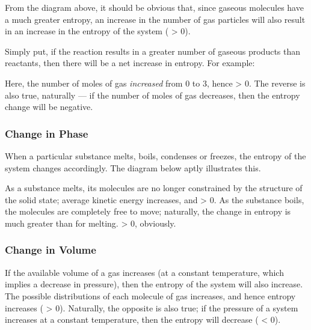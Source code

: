 				From the diagram above, it should be obvious that, since gaseous molecules have a much greater entropy, an increase in the number
				of gas particles will also result in an increase in the entropy of the system (\entr{} > 0).

				Simply put, if the reaction results in a greater number of gaseous products than reactants, then there will be a net
				increase in entropy. For example:


				Here, the number of moles of gas \emph{increased} from 0 to 3, hence \entr{} > 0. The reverse is also true, naturally --- if the
				number of moles of gas decreases, then the entropy change will be negative.


			\pagebreak
			\subsubsection{Change in Phase}

				When a particular substance melts, boils, condenses or freezes, the entropy of the system changes accordingly.
				The diagram below aptly illustrates this.


				As a substance melts, its molecules are no longer constrained by the structure of the solid state; average kinetic energy increases,
				and \entr{} > 0. As the substance boils, the molecules are completely free to move; naturally, the change in entropy is much greater
				than for melting. \entr{} > 0, obviously.


			\subsubsection{Change in Volume}

				If the available volume of a gas increases (at a constant temperature, which implies a decrease in pressure), then the entropy
				of the system will also increase. The possible distributions of each molecule of gas increases, and hence entropy increases
				(\entr{} > 0). Naturally, the opposite is also true; if the pressure of a system increases at a constant temperature, then the entropy
				will decrease (\entr{} < 0).

